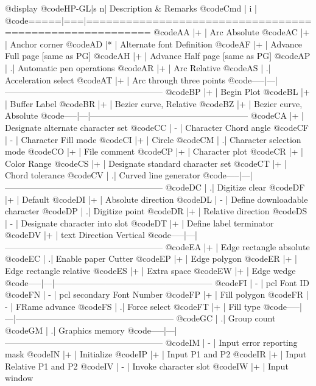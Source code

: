 @display
@code{HP-GL|s n| Description & Remarks}
@code{Cmd  | i |}
@code{=====|===|========================================================}
@code{AA   |+  | Arc Absolute}
@code{AC   |+  | Anchor corner}
@code{AD   |*  | Alternate font Definition}
@code{AF   |+  | Advance Full page [same as PG]}
@code{AH   |+  | Advance Half page [same as PG]}
@code{AP   |  .| Automatic pen operations}
@code{AR   |+  | Arc Relative}
@code{AS   |  .| Acceleration select}
@code{AT   |+  | Arc through three points}
@code{-----|---|--------------------------------------------------------}
@code{BP   |+  | Begin Plot}
@code{BL   |+  | Buffer Label}
@code{BR   |+  | Bezier curve, Relative}
@code{BZ   |+  | Bezier curve, Absolute}
@code{-----|---|--------------------------------------------------------}
@code{CA   |+  | Designate alternate character set}
@code{CC   | - | Character Chord angle}
@code{CF   | - | Character Fill mode}
@code{CI   |+  | Circle}
@code{CM   |  .| Character selection mode}
@code{CO   |+  | File comment}
@code{CP   |+  | Character plot}
@code{CR   |+  | Color Range}
@code{CS   |+  | Designate standard character set}
@code{CT   |+  | Chord tolerance}
@code{CV   |  .| Curved line generator}
@code{-----|---|--------------------------------------------------------}
@code{DC   |  .| Digitize clear}
@code{DF   |+  | Default}
@code{DI   |+  | Absolute direction}
@code{DL   | - | Define downloadable character}
@code{DP   |  .| Digitize point}
@code{DR   |+  | Relative direction}
@code{DS   | - | Designate character into slot}
@code{DT   |+  | Define label terminator}
@code{DV   |+  | text Direction Vertical}
@code{-----|---|--------------------------------------------------------}
@code{EA   |+  | Edge rectangle absolute}
@code{EC   |  .| Enable paper Cutter}
@code{EP   |+  | Edge polygon}
@code{ER   |+  | Edge rectangle relative}
@code{ES   |+  | Extra space}
@code{EW   |+  | Edge wedge}
@code{-----|---|--------------------------------------------------------}
@code{FI   | - | pcl Font ID}
@code{FN   | - | pcl secondary Font Number}
@code{FP   |+  | Fill polygon}
@code{FR   | - | FRame advance}
@code{FS   |  .| Force select}
@code{FT   |+  | Fill type}
@code{-----|---|--------------------------------------------------------}
@code{GC   |  .| Group count}
@code{GM   |  .| Graphics memory}
@code{-----|---|--------------------------------------------------------}
@code{IM   | - | Input error reporting mask}
@code{IN   |+  | Initialize}
@code{IP   |+  | Input P1 and P2}
@code{IR   |+  | Input Relative P1 and P2}
@code{IV   | - | Invoke character slot}
@code{IW   |+  | Input window}
